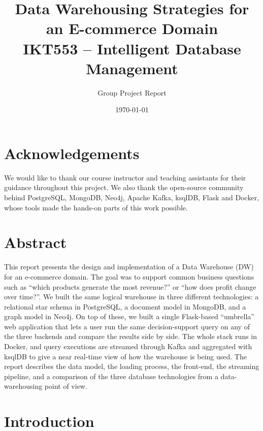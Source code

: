 \documentclass[11pt,a4paper]{article}
\title{
    \textbf{Data Warehousing Strategies for an E-commerce Domain} \\
    \large IKT553 -- Intelligent Database Management
}
\author{Group Project Report}
\date{\today}
\begin{document}
\maketitle

\section*{Acknowledgements}

We would like to thank our course instructor and teaching assistants for their
guidance throughout this project. We also thank the open-source community behind
PostgreSQL, MongoDB, Neo4j, Apache Kafka, ksqlDB, Flask and Docker, whose tools
made the hands-on parts of this work possible.

\section*{Abstract}

This report presents the design and implementation of a Data Warehouse (DW)
for an e-commerce domain. The goal was to support common business questions
such as ``which products generate the most revenue?'' or ``how does profit
change over time?''. We built the same logical warehouse in three different
technologies: a relational star schema in PostgreSQL, a document model in
MongoDB, and a graph model in Neo4j. On top of these, we built a single
Flask-based ``umbrella'' web application that lets a user run the same
decision-support query on any of the three backends and compare the results
side by side. The whole stack runs in Docker, and query executions are
streamed through Kafka and aggregated with ksqlDB to give a near real-time
view of how the warehouse is being used. The report describes the data model,
the loading process, the front-end, the streaming pipeline, and a comparison
of the three database technologies from a data-warehousing point of view.

\tableofcontents
\listoffigures
\listoftables
\newpage

\section{Introduction}
\end{document}
